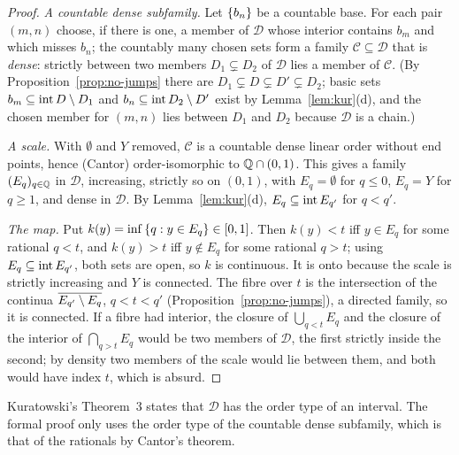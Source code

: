 \begin{proof}
\emph{A countable dense subfamily.} Let $\left\{ b_n \right\}$ be a countable base. For each pair $(m,n)$ choose, if there is one,
a member of $\mathcal D$ whose interior contains $b_m$ and which misses $b_n$; the countably many chosen sets form a family
$\mathcal C\subseteq\mathcal D$ that is \emph{dense}: strictly between two members $D_1\subsetneq D_2$ of $\mathcal D$ lies a member of
$\mathcal C$. (By Proposition~\ref{prop:no-jumps} there are $D_1\subsetneq D\subsetneq D'\subsetneq D_2$; basic sets $b_m\subseteq\operatorname{int}
D\setminus D_1$ and $b_n\subseteq\operatorname{int} D_2\setminus D'$ exist by Lemma~\ref{lem:kur}(d), and the chosen member for $(m,n)$
lies between $D_1$ and $D_2$ because $\mathcal D$ is a chain.)

\emph{A scale.} With $\emptyset$ and $Y$ removed, $\mathcal C$ is a countable dense linear order without end points, hence
(Cantor) order-isomorphic to $\mathbb{Q}\cap(0,1)$. This gives a family $(E_q)_{q\in\mathbb{Q}}$ in $\mathcal D$, increasing, strictly so on
$(0,1)$, with $E_q=\emptyset$ for $q\le0$, $E_q=Y$ for $q\ge1$, and dense in $\mathcal D$. By Lemma~\ref{lem:kur}(d),
$E_q\subseteq\operatorname{int} E_{q'}$ for $q<q'$.

\emph{The map.} Put $k(y)=\inf\left\{ q:y\in E_q \right\}\in[0,1]$. Then $k(y)<t$ iff $y\in E_q$ for some rational $q<t$, and
$k(y)>t$ iff $y\notin E_q$ for some rational $q>t$; using $E_q\subseteq\operatorname{int} E_{q'}$, both sets are open, so $k$ is
continuous. It is onto because the scale is strictly increasing and $Y$ is connected. The fibre over $t$ is the
intersection of the continua $\overline{E_{q'}\setminus E_q}$, $q<t<q'$ (Proposition~\ref{prop:no-jumps}), a directed family, so it
is connected. If a fibre had interior, the closure of $\bigcup_{q<t}E_q$ and the closure of the interior of
$\bigcap_{q>t}E_q$ would be two members of $\mathcal D$, the first strictly inside the second; by density two
members of the scale would lie between them, and both would have index $t$, which is absurd.
\end{proof}


\begin{remark}
Kuratowski's Theorem~3 states that $\mathcal D$ has the order type of an interval. The formal proof only uses
the order type of the countable dense subfamily, which is that of the rationals by Cantor's theorem.
\end{remark}

